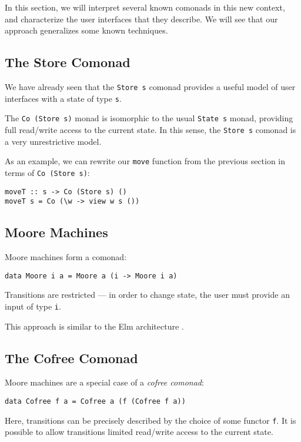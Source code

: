 \documentclass[nocopyrightspace]{sigplanconf}
\begin{document}
In this section, we will interpret several known comonads in this new context, and
characterize the user interfaces that they describe. We will see that our approach
generalizes some known techniques.

\subsection{The Store Comonad}

We have already seen that the \texttt{Store s} comonad provides a useful model of
user interfaces with a state of type \texttt{s}.

The \texttt{Co (Store s)} monad is isomorphic to the usual \texttt{State s} monad,
providing full read/write access to the current state. In this
sense, the \texttt{Store s} comonad is a very unrestrictive model.

As an example, we can rewrite our \texttt{move} function from the previous section
in terms of \texttt{Co (Store s)}:

\begin{verbatim}
moveT :: s -> Co (Store s) ()
moveT s = Co (\w -> view w s ())
\end{verbatim}

\subsection{Moore Machines}

Moore machines form a comonad:

\begin{verbatim}
data Moore i a = Moore a (i -> Moore i a)
\end{verbatim}

Transitions are restricted --- in order to change state, the user
must provide an input of type \texttt{i}.

This approach is similar to the Elm architecture \citep{elm}.

\subsection{The Cofree Comonad}

Moore machines are a special case of a \textit{cofree comonad}:

\begin{verbatim}
data Cofree f a = Cofree a (f (Cofree f a))
\end{verbatim}

Here, transitions can be precisely described by the choice of some functor \texttt{f}.
It is possible to allow transitions limited read/write access to the current
state.
\end{document}
